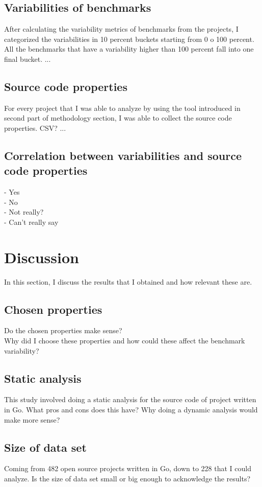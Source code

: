 \documentclass{seal_thesis}
\begin{document}
\section{Variabilities of benchmarks}
After calculating the variability metrics of benchmarks from the projects, I categorized the variabilities in 10 percent buckets starting from 0 o 100 percent. All the benchmarks that have a variability higher than 100 percent fall into one final bucket. ...

\section{Source code properties}
For every project that I was able to analyze by using the tool introduced in second part of methodology section, I was able to collect the source code properties. CSV? ...

\section{Correlation between variabilities and source code properties}
- Yes \\
- No \\
- Not really? \\
- Can't really say \\



\chapter{Discussion}
In this section, I discuss the results that I obtained and how relevant these are.
\section{Chosen properties}
Do the chosen properties make sense? \\
Why did I choose these properties and how could these affect the benchmark variability? \\

\section{Static analysis}
This study involved doing a static analysis for the source code of project written in Go. What pros and cons does this have? Why doing a dynamic analysis would make more sense?

\section{Size of data set}
Coming from 482 open source projects written in Go, down to 228 that I could analyze. Is the size of data set small or big enough to acknowledge the results?
\end{document}
